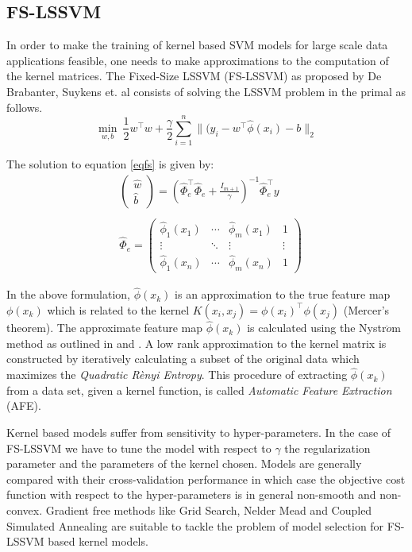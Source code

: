 \documentclass[conference, cmex10]{IEEEtran}
\begin{document}
\subsection{FS-LSSVM} \label{sec:fs}
In order to make the training of kernel based SVM models for large scale data applications feasible, one needs to make approximations to the computation of the kernel matrices. The Fixed-Size LSSVM (FS-LSSVM) as proposed by De Brabanter, Suykens et. al \cite{DeBrabanter2010} consists of solving the LSSVM problem in the primal as follows.
\begin{equation}
\label{eqfs}
\min_{w,b} \ \frac{1}{2}w^{\intercal} w + \frac{\gamma}{2}\sum^{n}_{i=1} \|(y_{i} - w^{\intercal} \hat{\phi}(x_i) - b\|_{2} 
\end{equation}

The solution to equation \ref{eqfs} is given by:
\begin{align*}
\label{eqfssol}
& \left( \begin{matrix}
\hat{w}\\ 
\hat{b}
\end{matrix}\right ) = 
\left ( \hat{\Phi}^{\intercal}_e \hat{\Phi}_e + \frac{\mathit{I}_{m+1}}{\gamma} \right )^{-1} \hat{\Phi}^{\intercal}_e y
\\ \\
& \hat{\Phi}_e = \begin{pmatrix}
\hat{\phi}_{1}(x_1) & \cdots & \hat{\phi}_{m}(x_1) & 1\\ 
\vdots &  \ddots & \vdots & \vdots\\ 
\hat{\phi}_{1}(x_n) & \cdots & \hat{\phi}_{m}(x_n) & 1
\end{pmatrix}
\end{align*}

In the above formulation, $\hat{\phi}(x_k)$ is an approximation to the true feature map $\phi(x_k)$ which is related to the kernel $K(x_i, x_j) = \phi(x_i)^{\intercal} \phi(x_j)$ (Mercer's theorem). The approximate feature map $\hat{\phi}(x_k)$ is calculated using the Nystr$\ddot{o}$m method as outlined in \cite{DeBrabanter2010,Mall2015} and \cite{Mall2013}. A low rank approximation to the kernel matrix is constructed by iteratively calculating a subset of the original data which maximizes the \textit{Quadratic R\`enyi Entropy}. This procedure of extracting $\hat{\phi}(x_k)$ from a data set, given a kernel function, is called \textit{Automatic Feature Extraction} (AFE).

Kernel based models suffer from sensitivity to hyper-parameters. In the case of FS-LSSVM we have to tune the model with respect to $\gamma$ the regularization parameter and the parameters of the kernel chosen. Models are generally compared with their cross-validation performance in which case the objective cost function with respect to the hyper-parameters is in general non-smooth and non-convex. Gradient free methods like Grid Search, Nelder Mead \cite{Nelder1965} and Coupled Simulated Annealing \cite{Xavier-De-Souza2010} are suitable to tackle the problem of model selection for FS-LSSVM based kernel models.
\end{document}
